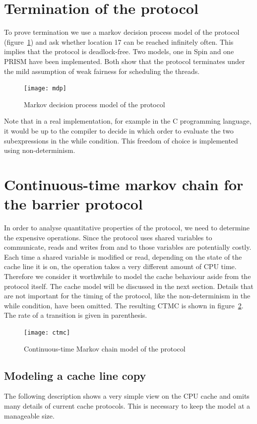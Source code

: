 \documentclass[a4paper, 10pt]{article}
\begin{document}
\section{Termination of the protocol}
To prove termination we use a markov decision process model of the protocol (figure~\ref{fig:mdp}) and ask whether location 17 can be reached infinitely often. This implies that the protocol is deadlock-free. Two models, one in Spin\cite{spin} and one PRISM\cite{prism} have been implemented. Both show that the protocol terminates under the mild assumption of weak fairness for scheduling the threads.
\begin{figure}[htbp]
	\centering
	\texttt{[image: mdp]}
	\caption{Markov decision process model of the protocol}
	\label{fig:mdp}
\end{figure}
Note that in a real implementation, for example in the C programming language, it would be up to the compiler to decide in which order to evaluate the two subexpressions in the while condition. This freedom of choice is implemented using non-determinism.

\clearpage

\section{Continuous-time markov chain for the barrier protocol}
In order to analyse quantitative properties of the protocol, we need to determine the expensive operations. Since the protocol uses shared variables to communicate, reads and writes from and to those variables are potentially costly. Each time a shared variable is modified or read, depending on the state of the cache line it is on, the operation takes a very different amount of CPU time. Therefore we consider it worthwhile to model the cache behaviour aside from the protocol itself. The cache model will be discussed in the next section. Details that are not important for the timing of the protocol, like the non-determinism in the while condition, have been omitted. The resulting CTMC is shown in figure~\ref{fig:ctmc}. The rate of a transition is given in parenthesis.
\begin{figure}[htbp]
	\centering
	\texttt{[image: ctmc]}
	\caption{Continuous-time Markov chain model of the protocol}
	\label{fig:ctmc}
\end{figure}
\clearpage
\subsection{Modeling a cache line copy}
The following description shows a very simple view on the CPU cache and omits many details of current cache protocols. This is necessary to keep the model at a manageable size.
\end{document}
